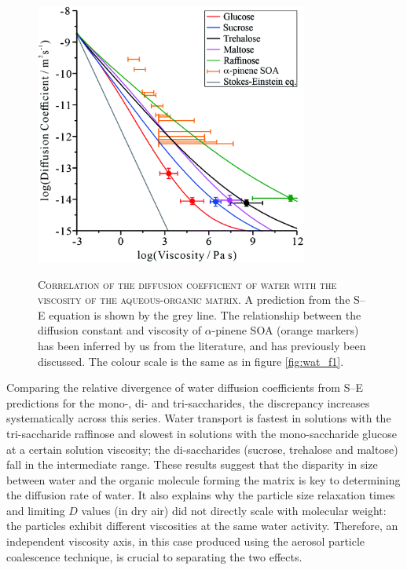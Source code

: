 \begin{figure}
    \centering
    \caption[Correlation of the diffusion coefficient of water with the viscosity of the aqueous-organic matrix]{\textsc{Correlation of the diffusion coefficient of water with the viscosity of the aqueous-organic matrix}.  A prediction from the S–E equation is shown by the grey line. The relationship between the diffusion constant and viscosity of $\alpha$-pinene SOA (orange markers) has been inferred by us from the literature, and has previously been discussed.\cite{Price2015,Chen2013} The colour scale is the same as in figure \ref{fig:wat_f1}.} 
    \includegraphics[width=0.8\textwidth]{chapters/water_hopping/figures/f2.png}
    \label{fig:wat_f2}
\end{figure}

Comparing the relative divergence of water diffusion coefficients from S–E predictions for the mono-, di- and tri-saccharides, the discrepancy increases systematically across this series. Water transport is fastest in solutions with the tri-saccharide raffinose and slowest in solutions with the mono-saccharide glucose at a certain solution viscosity; the di-saccharides (sucrose, trehalose and maltose) fall in the intermediate range. These results suggest that the disparity in size between water and the organic molecule forming the matrix is key to determining the diffusion rate of water. It also explains why the particle size relaxation times and limiting $D$ values (in dry air) did not directly scale with molecular weight: the particles exhibit different viscosities at the same water activity. Therefore, an independent viscosity axis, in this case produced using the aerosol particle coalescence technique, is crucial to separating the two effects.

